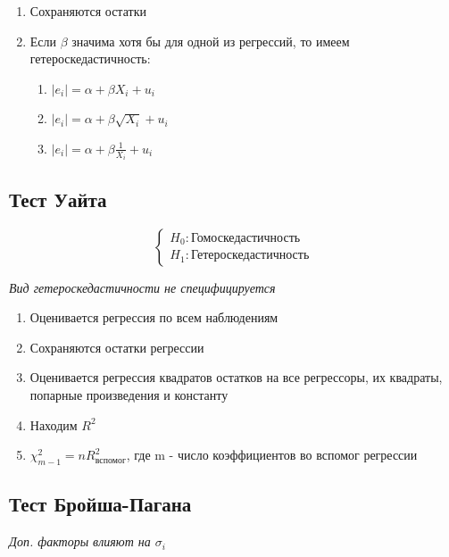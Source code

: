 \documentclass[a4paper, 12pt]{article}
\begin{document}
\begin{enumerate}
    \item Сохраняются остатки
    \item Если $\beta$ значима хотя бы для одной из регрессий, то имеем гетероскедастичность:
    \begin{enumerate}
        \item $|e_{i}| = \alpha + \beta X_{i} + u_{i}$
        \item $|e_{i}| = \alpha + \beta \sqrt{X_{i}} + u_{i}$
        \item $|e_{i}| = \alpha + \beta \frac{1}{X_{i}} + u_{i}$
    \end{enumerate}
\end{enumerate}

\subsection{Тест Уайта}

\[\begin{cases}
    H_{0}: \textrm{Гомоскедастичность} \\
    H_{1}: \textrm{Гетероскедастичность}
\end{cases}\]

\begin{center}
    \textit{Вид гетероскедастичности не специфицируется}
\end{center}

\begin{enumerate}
    \item Оценивается регрессия по всем наблюдениям
    \item Сохраняются остатки регрессии
    \item Оценивается регрессия квадратов остатков на все регрессоры, их квадраты, попарные произведения и константу
    \item Находим $R^{2}$
    \item $\chi^{2}_{m - 1} = nR^{2}_{вспомог}$, где m - число коэффициентов во вспомог регрессии
\end{enumerate}

\subsection{Тест Бройша-Пагана}

\begin{center}
    \textit{Доп. факторы влияют на $\sigma_{i}$}
\end{center}
\end{document}
